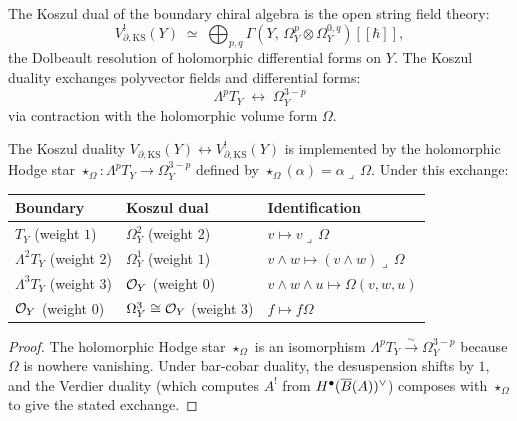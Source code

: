 \begin{definition}
The Koszul dual of the boundary chiral algebra is the open string
field theory:
\begin{equation}%
V_{\partial,\mathrm{KS}}^!(Y)
\;\simeq\;
\bigoplus_{p,q}
\Gamma(Y,\,\Omega^p_Y\otimes\Omega^{0,q}_Y)[[\hbar]],
\end{equation}
the Dolbeault resolution of holomorphic differential forms on $Y$.
The Koszul duality exchanges polyvector fields and differential
forms:
\begin{equation}%
\Lambda^p T_Y \;\longleftrightarrow\; \Omega^{3-p}_Y
\end{equation}
via contraction with the holomorphic volume form $\Omega$.
\end{definition}

\begin{proposition}
The Koszul duality
$V_{\partial,\mathrm{KS}}(Y)\leftrightarrow
V_{\partial,\mathrm{KS}}^!(Y)$
is implemented by the holomorphic Hodge star
$\star_\Omega:\Lambda^p T_Y\to\Omega^{3-p}_Y$
defined by $\star_\Omega(\alpha)=\alpha\lrcorner\,\Omega$.
Under this exchange:
\begin{center}
\renewcommand{\arraystretch}{1.2}
\begin{tabular}{lll}
\textbf{Boundary} & \textbf{Koszul dual} & \textbf{Identification} \\
\hline
$T_Y$ (weight $1$) & $\Omega^2_Y$ (weight $2$) & $v\mapsto v\lrcorner\,\Omega$ \\
$\Lambda^2 T_Y$ (weight $2$) & $\Omega^1_Y$ (weight $1$) &
$v\wedge w\mapsto(v\wedge w)\lrcorner\,\Omega$ \\
$\Lambda^3 T_Y$ (weight $3$) & $\mathcal O_Y$ (weight $0$) &
$v\wedge w\wedge u\mapsto\Omega(v,w,u)$ \\
$\mathcal O_Y$ (weight $0$) & $\Omega^3_Y\cong\mathcal O_Y$ (weight $3$) &
$f\mapsto f\Omega$
\end{tabular}
\end{center}
\end{proposition}

\begin{proof}
The holomorphic Hodge star $\star_\Omega$ is an isomorphism
$\Lambda^p T_Y\xrightarrow{\sim}\Omega^{3-p}_Y$ because $\Omega$
is nowhere vanishing. Under bar-cobar duality, the desuspension
shifts by $1$, and the Verdier duality (which computes $A^!$
from $H^\bullet(\overline{B}(A))^\vee$) composes with $\star_\Omega$
to give the stated exchange.
\end{proof}


